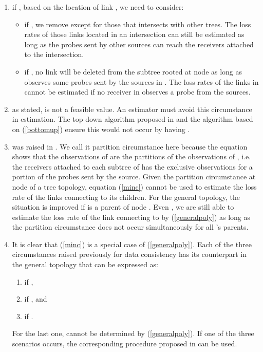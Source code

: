 \documentclass[10pt,twocolumn]{IEEEtran}
\begin{document}
\begin{enumerate}
\item if , based on the location of link , we need to
consider:
\begin{itemize}
\item if , we remove  except for those that intersects with other trees. The loss rates of those links
located in an intersection can still be estimated as long as the
probes sent by other sources can reach the receivers attached to the
intersection.
\item if , no link will be  deleted from the
subtree rooted at node  as long as  observes
some probes sent by the sources in . The loss rates of the links
in  cannot be estimated if no receiver in  observes a
probe from the sources.
\end{itemize}
\item as \cite{CDHT99} stated,  is not a feasible value. An estimator must avoid this circumstance in estimation.
The top down algorithm proposed in \cite{Zhu06} and the algorithm
based on (\ref{bottomup}) ensure this would not occur by having .
\item  was raised in
\cite{CDHT99}. We call it partition circumstance here because the
equation shows that the observations of  are the
partitions of the observations of , i.e. the receivers attached
to each subtree of  has the exclusive observations for a portion
of the probes sent by the source. Given the partition circumstance at
node  of a tree topology, equation (\ref{minc}) cannot be used to
estimate the loss rate of the links connecting  to its children.
For the general topology, the situation is improved if  is a parent
of node . Even , we are still able to estimate the loss rate of the
link connecting  to  by (\ref{generalpoly}) as long as the
partition circumstance does not occur simultaneously for all 's
parents.
\item \label{dataconsistent} It is clear that (\ref{minc}) is a special case of (\ref{generalpoly}).
Each of the three circumstances raised previously for data consistency
has its counterpart in the general topology that can be expressed as:
\begin{enumerate}
\item if ,
\item if , and
\item if .  \end{enumerate} For the last one,
 cannot be determined by (\ref{generalpoly}). If
one of the three scenarios occurs, the corresponding procedure
proposed in \cite{CDHT99} can be used.
\end{enumerate}
\end{document}
